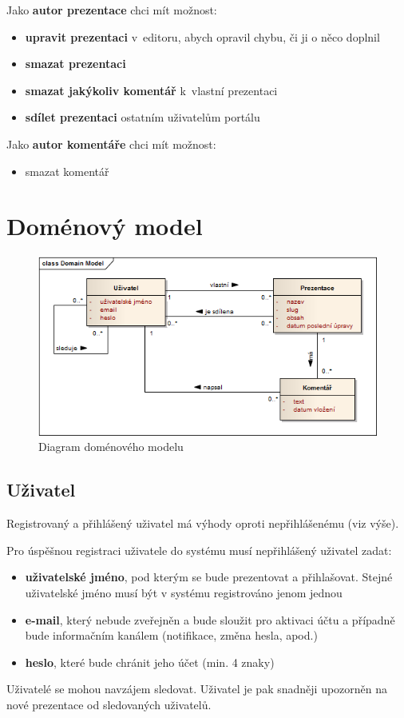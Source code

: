 \documentclass[11pt,twoside,a4paper]{book}
\begin{document}
\noindent Jako \textbf{autor prezentace} chci mít možnost:
\begin{itemize}
	\item \textbf{upravit prezentaci }v~editoru, abych opravil chybu, či ji o něco doplnil
	\item \textbf{smazat prezentaci}
	\item \textbf{smazat jakýkoliv komentář} k~vlastní prezentaci
	\item \textbf{sdílet prezentaci} ostatním uživatelům portálu
\end{itemize}


\noindent Jako \textbf{autor komentáře} chci mít možnost:
\begin{itemize}
	\item smazat komentář
\end{itemize}


\chapter{Doménový model}
\begin{figure}[ht]
	\begin{center}
		\includegraphics[width=14cm]{PRO-img/PRO-img001.png}
		\caption{Diagram doménového modelu}
		\label{fig:domainModel}
	\end{center}
\end{figure}

\section{Uživatel}
Registrovaný a přihlášený uživatel má výhody oproti nepřihlášenému (viz výše).

Pro úspěšnou registraci uživatele do systému musí nepřihlášený uživatel zadat:

\begin{itemize}
	\item \textbf{uživatelské jméno}, pod kterým se bude prezentovat a přihlašovat. Stejné uživatelské jméno musí být v systému registrováno jenom jednou
	\item \textbf{e-mail}, který nebude zveřejněn a bude sloužit pro aktivaci účtu a případně bude informačním kanálem (notifikace, změna hesla, apod.)
	\item \textbf{heslo}, které bude chránit jeho účet (min. 4 znaky)
\end{itemize}
Uživatelé se mohou navzájem sledovat. Uživatel je pak snadněji upozorněn na nové prezentace od sledovaných uživatelů.
\end{document}
